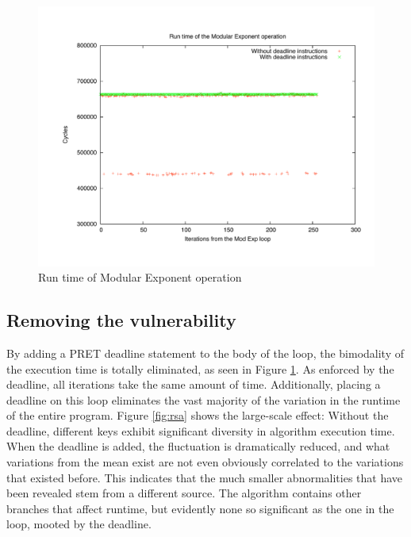 \documentclass[times, 10pt,twocolumn]{article}
\begin{document}
\begin{figure}[ht]
  \centering
  \includegraphics[scale=.3]{./images/ModExp.pdf}
  \caption{Run time of Modular Exponent operation}
  \label{fig:modexp}
\end{figure}

\subsection{Removing the vulnerability}
By adding a PRET deadline statement to the body of the loop, the bimodality of the execution time is totally eliminated, as seen in Figure \ref{fig:modexp}.  As enforced by the deadline, all iterations take the same amount of time.  Additionally, placing a deadline on this loop eliminates the vast majority of the variation in the runtime of the entire program.  Figure \ref{fig:rsa} shows the large-scale effect:  Without the deadline, different keys exhibit significant diversity in algorithm execution time.  When the deadline is added, the fluctuation is dramatically reduced, and what variations from the mean exist are not even obviously correlated to the variations that existed before.  This indicates that the much smaller abnormalities that have been revealed stem from a different source.  The algorithm contains other branches that affect runtime, but evidently none so significant as the one in the loop, mooted by the deadline.
\end{document}
